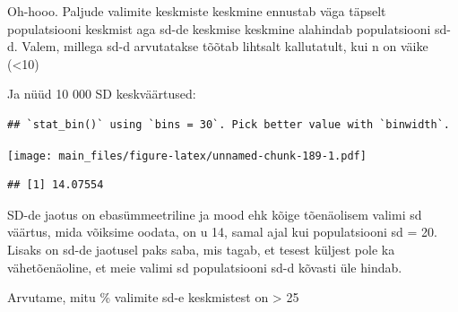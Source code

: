\documentclass[]{book}
\newenvironment{Shaded}{\begin{snugshade}}{\end{snugshade}}
\newcommand{\KeywordTok}[1]{\textcolor[rgb]{0.13,0.29,0.53}{\textbf{#1}}}
\newcommand{\DataTypeTok}[1]{\textcolor[rgb]{0.13,0.29,0.53}{#1}}
\newcommand{\DecValTok}[1]{\textcolor[rgb]{0.00,0.00,0.81}{#1}}
\newcommand{\StringTok}[1]{\textcolor[rgb]{0.31,0.60,0.02}{#1}}
\newcommand{\ControlFlowTok}[1]{\textcolor[rgb]{0.13,0.29,0.53}{\textbf{#1}}}
\newcommand{\OperatorTok}[1]{\textcolor[rgb]{0.81,0.36,0.00}{\textbf{#1}}}
\newcommand{\NormalTok}[1]{#1}
\begin{document}
Oh-hooo. Paljude valimite keskmiste keskmine ennustab väga täpselt
populatsiooni keskmist aga sd-de keskmise keskmine alahindab
populatsiooni sd-d. Valem, millega sd-d arvutatakse tõõtab lihtsalt
kallutatult, kui n on väike (\textless{}10)

Ja nüüd 10 000 SD keskväärtused:

\begin{Shaded}
\end{Shaded}

\begin{verbatim}
## `stat_bin()` using `bins = 30`. Pick better value with `binwidth`.
\end{verbatim}

\texttt{[image: main\_files/figure-latex/unnamed-chunk-189-1.pdf]}

\begin{Shaded}
\end{Shaded}

\begin{verbatim}
## [1] 14.07554
\end{verbatim}

SD-de jaotus on ebasümmeetriline ja mood ehk kõige tõenäolisem valimi sd
väärtus, mida võiksime oodata, on u 14, samal ajal kui populatsiooni sd
= 20. Lisaks on sd-de jaotusel paks saba, mis tagab, et tesest küljest
pole ka vähetõenäoline, et meie valimi sd populatsiooni sd-d kõvasti üle
hindab.

Arvutame, mitu \% valimite sd-e keskmistest on \textgreater{} 25

\begin{Shaded}
\end{Shaded}
\end{document}
